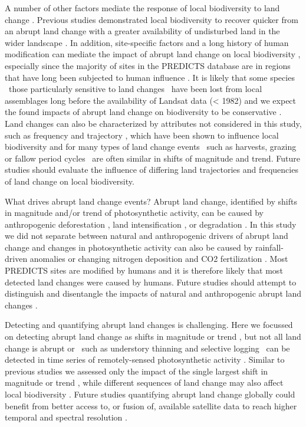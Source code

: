 A number of other factors mediate the response of local biodiversity to land change \citep{Arroyo-Rodriguez2015}.  Previous studies demonstrated local biodiversity to recover quicker from an abrupt land change with a greater availability of undisturbed land in the wider landscape \citep{Turner1989,Chase2003,Shackelford2017}. In addition, site-specific factors and a long history of human modification can mediate the impact of abrupt land change on local biodiversity \citep{Ellis2015a,Jung2016}, especially since the majority of sites in the PREDICTS database are in regions that have long been subjected to human influence \citep{Newbold2016,Hudson2016}. It is likely that some species \textendash\ those particularly sensitive to land changes \textendash\ have been lost from local assemblages long before the availability of Landsat data (< 1982) and we expect the found impacts of abrupt land change on biodiversity to be conservative \citep{Mihoub2017}. Land changes can also be characterized by attributes not considered in this study, such as frequency and trajectory \citep{Watson2014}, which have been shown to influence local biodiversity \citep{Tiemann2015,Wood2017} and for many types of land change events \textendash\ such as harvests, grazing or fallow period cycles \citep{Kleyer2007,Ray2013} \textendash\ are often similar in shifts of magnitude and trend. Future studies should evaluate the influence of differing land trajectories and frequencies of land change on local biodiversity.

What drives abrupt land change events? Abrupt land change, identified by shifts in magnitude and/or trend of photosynthetic activity, can be caused by anthropogenic deforestation \citep{DeVries2015b}, land intensification \citep{Fensholt2012,Muller2014}, or degradation \citep{Tian2015,Aguiar2017}. In this study we did not separate between natural and anthropogenic drivers of abrupt land change and changes in photosynthetic activity can also be caused by rainfall-driven anomalies \citep{Papagiannopoulou2017} or changing nitrogen deposition and CO2 fertilization \citep{Zhu2016}. Most PREDICTS sites are modified by humans \citep{Newbold2016,Hudson2016} and it is therefore likely that most detected land changes were caused by humans. Future studies should attempt to distinguish and disentangle the impacts of natural and anthropogenic abrupt land changes \citep{Curtis2018}. 

Detecting and quantifying abrupt land changes is challenging. Here we focussed on detecting abrupt land change as shifts in magnitude or trend \citep{Verbesselt2010a}, but not all land change is abrupt \citep{Vogelmann2012a} or \textendash\ such as understory thinning and selective logging \textendash\ can be detected in time series of remotely-sensed photosynthetic activity \citep{Asner2005,Peres2006}. Similar to previous studies we assessed only the impact of the single largest shift in magnitude or trend \citep{DeJong2013,Song2018}, while different sequences of land change may also affect local biodiversity \citep{Watson2014}. Future studies quantifying abrupt land change globally could benefit from better access to, or fusion of, available satellite data to reach higher temporal and spectral resolution \citep{Reiche2015,Wulder2015}.

